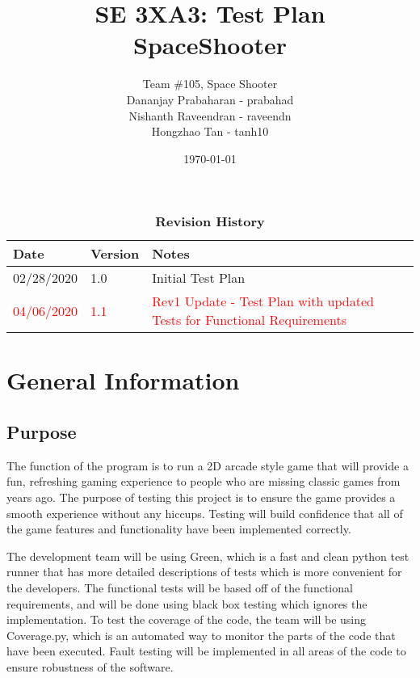 \documentclass[12pt, titlepage]{article}
\title{SE 3XA3: Test Plan\\SpaceShooter}
\author{Team \#105, Space Shooter
		\\ Dananjay Prabaharan - prabahad
		\\ Nishanth Raveendran - raveendn
		\\ Hongzhao Tan - tanh10
}
\date{\today}
\begin{document}
\maketitle

\tableofcontents
\listoftables
\listoffigures

\begin{table}[bp]
\caption{\bf Revision History}
\begin{tabularx}{\textwidth}{p{3cm}p{2cm}X}
\toprule {\bf Date} & {\bf Version} & {\bf Notes}\\
\midrule
02/28/2020 & 1.0 & Initial Test Plan\\
\midrule
\textcolor{red}{04/06/2020} & \textcolor{red}{1.1} & \textcolor{red}{Rev1 Update - Test Plan with updated Tests for Functional Requirements} \\
\bottomrule
\end{tabularx}
\end{table}

\newpage


\section{General Information}

\subsection{Purpose}

The function of the program is to run a 2D arcade style game that will provide a fun, refreshing gaming experience to people who are missing classic games from years ago. The purpose of testing this project is to ensure the game provides a smooth experience without any hiccups. Testing will build confidence that all of the game features and functionality have been implemented correctly.

\bigskip

The development team will be using Green, which is a fast and clean python test runner that has more detailed descriptions of tests which is more convenient for the developers. The functional tests will be based off of the functional requirements, and will be done using black box testing which ignores the implementation. 
To test the coverage of the code, the team will be using Coverage.py, which is an automated way to monitor the parts of the code that have been executed. Fault testing will be implemented in all areas of the code to ensure robustness of the software. 
\end{document}
